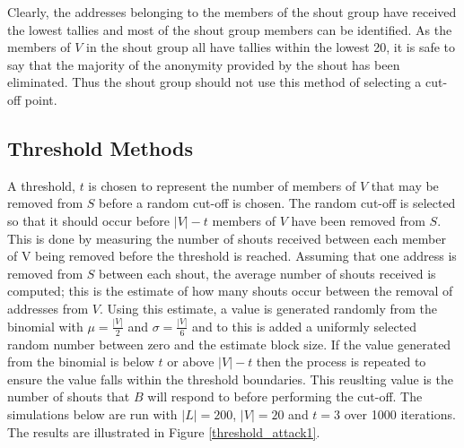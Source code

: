 \documentclass[ %
                    author={Luke Murray},
                supervisor={Dr. Simon Hollis},
                     title={Shadow Peer-to-Peer Networks},
                  subtitle={},
                    degree={MEng},
                      year={2013} ]{thesis}
\begin{document}
Clearly, the addresses belonging to the members of the shout group have received the lowest tallies and most of the shout group members can be identified. As the members of $V$ in the shout group all have tallies within the lowest 20, it is safe to say that the majority of the anonymity provided by the shout has been eliminated. Thus the shout group should not use this method of selecting a cut-off point.

\subsection{Threshold Methods}

A threshold, $t$ is chosen to represent the number of members of $V$ that may be removed from $S$ before a random cut-off is chosen. The random cut-off is selected so that it should occur before $|V| - t$ members of $V$ have been removed from $S$. This is done by measuring the number of shouts received between each member of V being removed before the threshold is reached. Assuming that one address is removed from $S$ between each shout, the average number of shouts received is computed; this is the estimate of how many shouts occur between the removal of addresses from $V$. Using this estimate, a value is generated randomly from the binomial with $\mu=\frac{|V|}{2}$ and $\sigma=\frac{|V|}{6}$ and to this is added a uniformly selected random number between zero and the estimate block size. If the value generated from the binomial is below $t$ or above $|V| - t$ then the process is repeated to ensure the value falls within the threshold boundaries. This reuslting value is the number of shouts that $B$ will respond to before performing the cut-off. The simulations below are run with $|L| = 200$, $|V| = 20$ and $t = 3$ over 1000 iterations. The results are illustrated in Figure \ref{threshold_attack1}.
\end{document}
